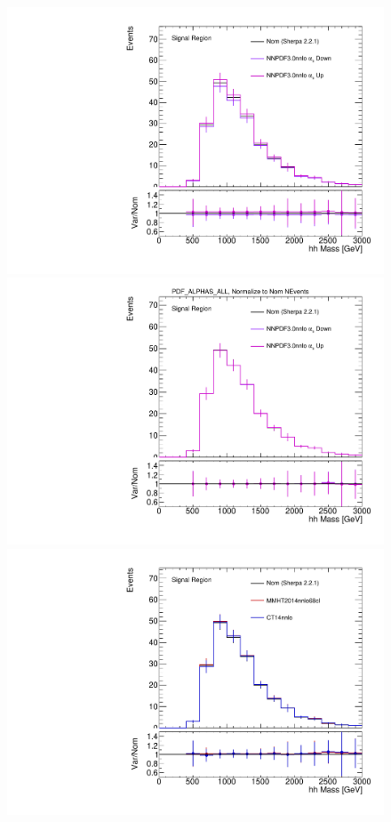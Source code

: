 \begin{figure}[!htbp]
\begin{center}
\includegraphics[scale=0.33]{./figures/boosted/systematics/wjets_alt_hhMass_SR_syst_PDF_ALPHAS_ALL_UnNormalized} 
\includegraphics[scale=0.33]{./figures/boosted/systematics/wjets_alt_hhMass_SR_syst_PDF_ALPHAS_ALL} \\
\includegraphics[scale=0.33]{./figures/boosted/systematics/wjets_alt_hhMass_SR_syst_PDF_ALTSETS_ALL_UnNormalized} 

\end{center}
\end{figure}
